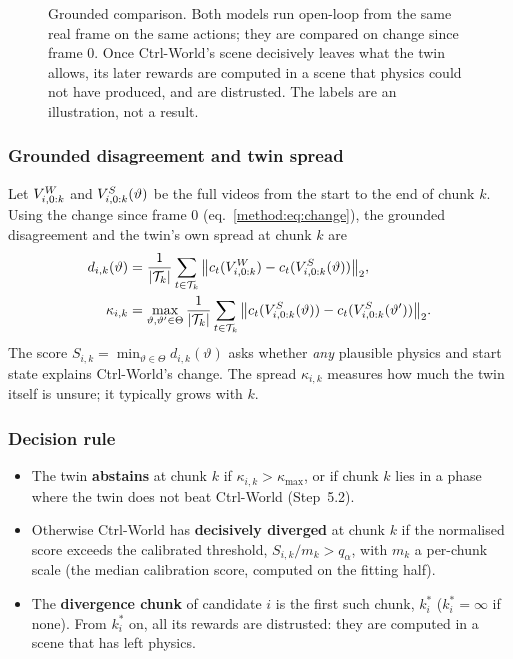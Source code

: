 \begin{figure}[h]
\centering

\caption{Grounded comparison. Both models run open-loop from the same real frame on the same actions; they are compared on change since frame 0. Once Ctrl-World's scene decisively leaves what the twin allows, its later rewards are computed in a scene that physics could not have produced, and are distrusted. The labels are an illustration, not a result.}
\label{method:fig:grounded}
\end{figure}

\subsubsection{Grounded disagreement and twin spread}
Let $V^{W}_{i,0:k}$ and $V^{S}_{i,0:k}(\vartheta)$ be the full videos from the start to the end of chunk $k$. Using the change since frame 0 (eq.~\ref{method:eq:change}), the grounded disagreement and the twin's own spread at chunk $k$ are
\begin{align}\label{method:eq:grounded}
d_{i,k}(\vartheta)&=\frac{1}{|\mathcal T_k|}\sum_{t\in\mathcal T_k}\big\lVert c_t(V^{W}_{i,0:k})-c_t(V^{S}_{i,0:k}(\vartheta))\big\rVert_2,\\
\kappa_{i,k}&=\max_{\vartheta,\vartheta'\in\Theta}\frac{1}{|\mathcal T_k|}\sum_{t\in\mathcal T_k}\big\lVert c_t(V^{S}_{i,0:k}(\vartheta))-c_t(V^{S}_{i,0:k}(\vartheta'))\big\rVert_2 .\notag
\end{align}
The score $S_{i,k}=\min_{\vartheta\in\Theta}d_{i,k}(\vartheta)$ asks whether \emph{any} plausible physics and start state explains Ctrl-World's change. The spread $\kappa_{i,k}$ measures how much the twin itself is unsure; it typically grows with $k$.

\subsubsection{Decision rule}
\begin{itemize}
\item The twin \textbf{abstains} at chunk $k$ if $\kappa_{i,k}>\kappa_{\max}$, or if chunk $k$ lies in a phase where the twin does not beat Ctrl-World (Step~5.2).
\item Otherwise Ctrl-World has \textbf{decisively diverged} at chunk $k$ if the normalised score exceeds the calibrated threshold, $S_{i,k}/m_k>q_\alpha$, with $m_k$ a per-chunk scale (the median calibration score, computed on the fitting half).
\item The \textbf{divergence chunk} of candidate $i$ is the first such chunk, $k^\ast_i$ ($k^\ast_i=\infty$ if none). From $k^\ast_i$ on, all its rewards are distrusted: they are computed in a scene that has left physics.
\end{itemize}

